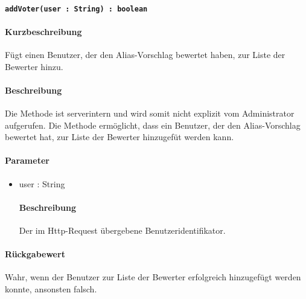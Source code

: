 \paragraph{\texttt{addVoter(user : String) : boolean}}%
\paragraph*{Kurzbeschreibung}
Fügt einen Benutzer, der den Alias-Vorschlag bewertet haben, zur Liste der Bewerter hinzu.
\paragraph*{Beschreibung}
Die Methode ist serverintern und wird somit nicht explizit vom Administrator aufgerufen.
Die Methode ermöglicht, dass ein Benutzer, der den Alias-Vorschlag bewertet hat, zur Liste der Bewerter hinzugefüt werden kann.
\paragraph*{Parameter}
\begin{itemize}
    \item user : String
    		\paragraph*{Beschreibung}
    		Der im Http-Request übergebene Benutzeridentifikator.
\end{itemize}
\paragraph*{Rückgabewert}
Wahr, wenn der Benutzer zur Liste der Bewerter erfolgreich hinzugefügt werden konnte, ansonsten falsch.
